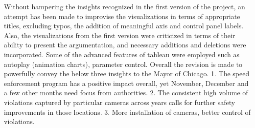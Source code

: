 \documentclass[]{book}
\begin{document}
Without hampering the insights recognized in the first version of the project, an attempt has been made to improvise the visualizations in terms of appropriate titles, excluding typos, the addition of meaningful axis and control panel labels. Also, the visualizations from the first version were criticized in terms of their ability to present the argumentation, and necessary additions and deletions were incorporated. Some of the advanced features of tableau were employed such as autoplay (animation charts), parameter control. Overall the revision is made to powerfully convey the below three insights to the Mayor of Chicago.
1. The speed enforcement program has a positive impact overall, yet November, December and a few other months need focus from authorities.
2. The consistent high volume of violations captured by particular cameras across years calls for further safety improvements in those locations.
3. More installation of cameras, better control of violations.


\end{document}
